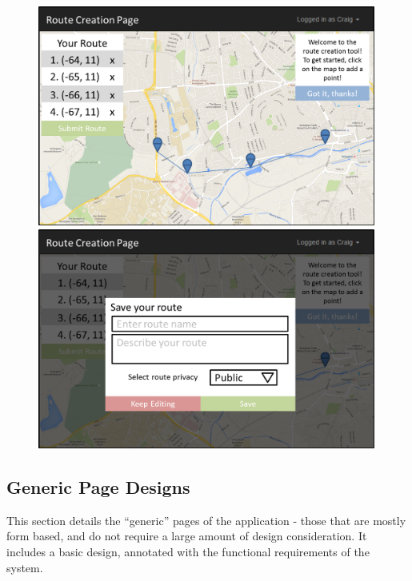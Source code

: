 \documentclass[a4paper,twoside,notitlepage,11pt]{article}
\begin{document}
\begin{figure}[!ht]
\centering
	\begin{minipage}{.49\textwidth}
		\includegraphics[width=0.99\textwidth]{images/ui-rcp-1.png}
	\end{minipage}
	\begin{minipage}{.49\textwidth}
	\includegraphics[width=0.99\textwidth]{images/ui-rcp-2.png}

	\end{minipage}
\end{figure}


\newpage 

\subsection{Generic Page Designs}
\label{subsec:gpd}
This section details the ``generic'' pages of the application - those that are mostly form based, and do not require a large amount of design consideration. It includes a basic design, annotated with the functional requirements of the system. 
\end{document}
